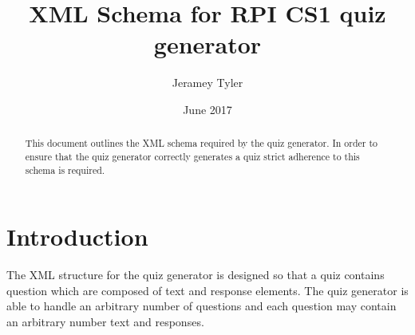 \documentclass{article}
\title{XML Schema for RPI CS1 quiz generator}
\author{Jeramey Tyler}
\date{June 2017}
\begin{document}
	\maketitle
	
	\begin{abstract}
	This document outlines the XML schema required by the quiz generator. In order to ensure that the quiz generator correctly generates a quiz strict adherence to this schema is required. 
	\end{abstract}
	\section{Introduction}
	The XML structure for the quiz generator is designed so that a quiz contains question which are composed of text and response elements. The quiz generator is able to handle an arbitrary number of questions and each question may contain an arbitrary number text and responses. 
\end{document}

